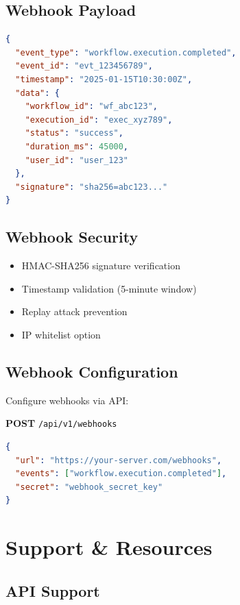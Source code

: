 \documentclass[11pt,a4paper]{report}
\begin{document}
\section{Webhook Payload}

\begin{lstlisting}[style=jsoncode,language=json]
{
  "event_type": "workflow.execution.completed",
  "event_id": "evt_123456789",
  "timestamp": "2025-01-15T10:30:00Z",
  "data": {
    "workflow_id": "wf_abc123",
    "execution_id": "exec_xyz789",
    "status": "success",
    "duration_ms": 45000,
    "user_id": "user_123"
  },
  "signature": "sha256=abc123..."
}
\end{lstlisting}

\section{Webhook Security}

\begin{itemize}[leftmargin=*]
    \item HMAC-SHA256 signature verification
    \item Timestamp validation (5-minute window)
    \item Replay attack prevention
    \item IP whitelist option
\end{itemize}

\section{Webhook Configuration}

Configure webhooks via API:

\textbf{POST} \texttt{/api/v1/webhooks}

\begin{lstlisting}[style=jsoncode,language=json]
{
  "url": "https://your-server.com/webhooks",
  "events": ["workflow.execution.completed"],
  "secret": "webhook_secret_key"
}
\end{lstlisting}

\newpage

\chapter{Support \& Resources}

\section{API Support}
\end{document}
